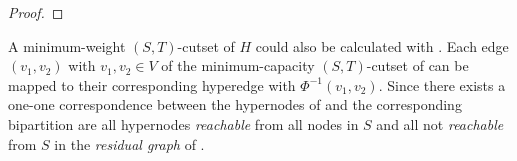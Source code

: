 \begin{proof}
%
\end{proof} 

A minimum-weight $(S,T)$-cutset of $H$ could also be calculated with . 
Each edge $(v_1,v_2)$ with $v_1,v_2 \in V$ of the minimum-capacity
$(S,T)$-cutset of  can be mapped to their corresponding hyperedge
with $\Phi^{-1}(v_1,v_2)$. Since there exists a one-one correspondence between the hypernodes
of  and  the corresponding bipartition are all hypernodes \emph{reachable}
from all nodes in $S$ and all not \emph{reachable} from $S$ in the \emph{residual graph}
of . 

